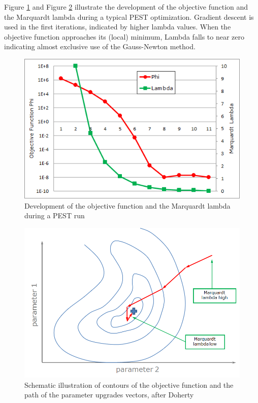 \begin{itemize}
Figure \ref{fig:fepest:PhiLambdaCompare} and Figure \ref{fig:fepest:PhiLambdaMap} illustrate the development of the objective function and the Marquardt lambda during a typical PEST optimization. Gradient descent is used in the first iterations, indicated by higher lambda values. When the objective function approaches its (local) minimum, Lambda falls to near zero indicating almost exclusive use of the Gauss-Newton method.

\begin{figure}
	\center
	\includegraphics[width=\columnwidth]{figures/PhiLambdaCompare.png}
\caption{Development of the objective function and the Marquardt lambda during a PEST run}
\label{fig:fepest:PhiLambdaCompare}
\end{figure}

\begin{figure}
	\center
	\includegraphics[width=\columnwidth]{figures/PhiLambdaMap.png}
\caption{Schematic illustration of contours of the objective function and the path of the parameter upgrades vectors, after Doherty}
\label{fig:fepest:PhiLambdaMap}
\end{figure}

\end{itemize}

